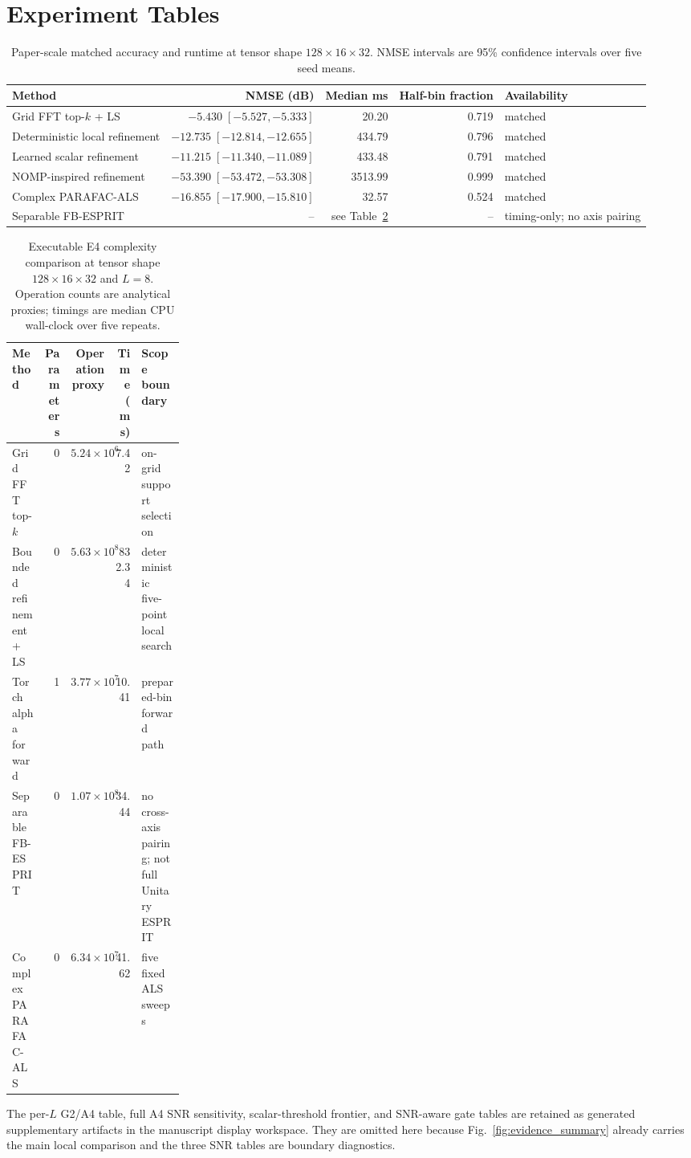 \section{Experiment Tables}

\begin{table}[t]
\centering
\caption{Paper-scale matched accuracy and runtime at tensor shape $128\times16\times32$. NMSE intervals are 95\% confidence intervals over five seed means.}
\label{tab:matched_accuracy}
\footnotesize
\begin{tabular}{lrrrl}
\toprule
Method & NMSE (dB) & Median ms & Half-bin fraction & Availability \\
\midrule
Grid FFT top-$k$ + LS & $-5.430\;[-5.527,-5.333]$ & 20.20 & 0.719 & matched \\
Deterministic local refinement & $-12.735\;[-12.814,-12.655]$ & 434.79 & 0.796 & matched \\
Learned scalar refinement & $-11.215\;[-11.340,-11.089]$ & 433.48 & 0.791 & matched \\
NOMP-inspired refinement & $-53.390\;[-53.472,-53.308]$ & 3513.99 & 0.999 & matched \\
Complex PARAFAC-ALS & $-16.855\;[-17.900,-15.810]$ & 32.57 & 0.524 & matched \\
Separable FB-ESPRIT & -- & see Table~\ref{tab:complexity} & -- & timing-only; no axis pairing \\
\bottomrule
\end{tabular}
\end{table}

\begin{table}[t]
\centering
\caption{Executable E4 complexity comparison at tensor shape $128\times16\times32$ and $L=8$. Operation counts are analytical proxies; timings are median CPU wall-clock over five repeats.}
\label{tab:complexity}
\footnotesize
\begin{tabular}{lrrrp{0.25\linewidth}}
\toprule
Method & Parameters & Operation proxy & Time (ms) & Scope boundary \\
\midrule
Grid FFT top-$k$ & 0 & $5.24\times10^6$ & 7.42 & on-grid support selection \\
Bounded refinement + LS & 0 & $5.63\times10^8$ & 832.34 & deterministic five-point local search \\
Torch alpha forward & 1 & $3.77\times10^7$ & 10.41 & prepared-bin forward path \\
Separable FB-ESPRIT & 0 & $1.07\times10^8$ & 34.44 & no cross-axis pairing; not full Unitary ESPRIT \\
Complex PARAFAC-ALS & 0 & $6.34\times10^7$ & 41.62 & five fixed ALS sweeps \\
\bottomrule
\end{tabular}
\end{table}

The per-$L$ G2/A4 table, full A4 SNR sensitivity, scalar-threshold frontier, and SNR-aware gate tables are retained as generated supplementary artifacts in the manuscript display workspace. They are omitted here because Fig.~\ref{fig:evidence_summary} already carries the main local comparison and the three SNR tables are boundary diagnostics.
